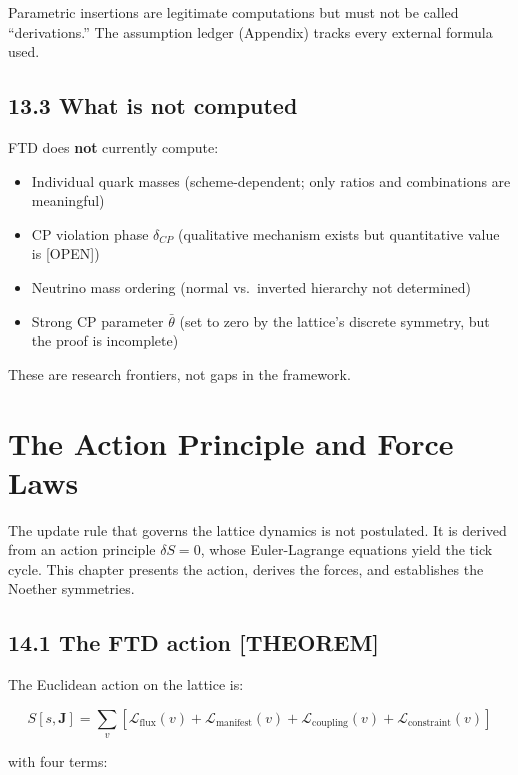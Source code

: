 \documentclass[
  11pt,
  letterpaper,
  twoside,
  openright]{book}
\providecommand{\tightlist}{%
  \setlength{\itemsep}{0pt}\setlength{\parskip}{0pt}}
\begin{document}
Parametric insertions are legitimate computations but must not be called
``derivations.'' The assumption ledger (Appendix) tracks every external
formula used.

\section{13.3 What is not computed}\label{what-is-not-computed}

FTD does \textbf{not} currently compute:

\begin{itemize}
\tightlist
\item
  Individual quark masses (scheme-dependent; only ratios and
  combinations are meaningful)
\item
  CP violation phase \(\delta_{CP}\) (qualitative mechanism exists but
  quantitative value is {[}OPEN{]})
\item
  Neutrino mass ordering (normal vs.~inverted hierarchy not determined)
\item
  Strong CP parameter \(\bar{\theta}\) (set to zero by the lattice's
  discrete symmetry, but the proof is incomplete)
\end{itemize}

These are research frontiers, not gaps in the framework.

\chapter{The Action Principle and Force Laws}\label{sec-action}

The update rule that governs the lattice dynamics is not postulated. It
is derived from an action principle \(\delta S = 0\), whose
Euler-Lagrange equations yield the tick cycle. This chapter presents the
action, derives the forces, and establishes the Noether symmetries.

\section{14.1 The FTD action
{[}THEOREM{]}}\label{the-ftd-action-theorem}

The Euclidean action on the lattice is:

\[
S[s, \mathbf{J}] = \sum_v \left[ \mathcal{L}_{\text{flux}}(v) + \mathcal{L}_{\text{manifest}}(v) + \mathcal{L}_{\text{coupling}}(v) + \mathcal{L}_{\text{constraint}}(v) \right]
\tag{14.1}
\]

with four terms:
\end{document}
